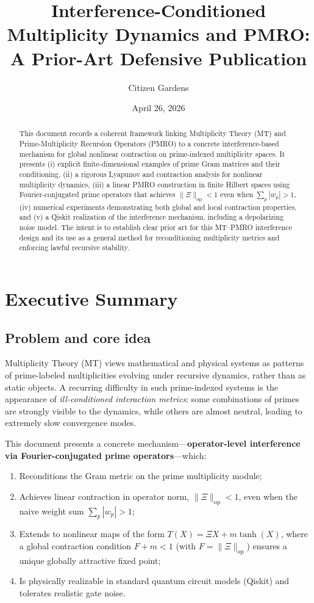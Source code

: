 \documentclass[11pt]{article}
\title{Interference-Conditioned Multiplicity Dynamics and PMRO:\\
A Prior-Art Defensive Publication}
\author{Citizen Gardens}
\affil{The Foundation of Multiplicity}
\date{April 26, 2026}
\begin{document}
\maketitle

\begin{abstract}
This document records a coherent framework linking Multiplicity Theory (MT) and Prime-Multiplicity Recursion Operators (PMRO) to a concrete interference-based mechanism for global nonlinear contraction on prime-indexed multiplicity spaces. It presents (i) explicit finite-dimensional examples of prime Gram matrices and their conditioning, (ii) a rigorous Lyapunov and contraction analysis for nonlinear multiplicity dynamics, (iii) a linear PMRO construction in finite Hilbert spaces using Fourier-conjugated prime operators that achieves $\|\Xi\|_{\mathrm{op}} < 1$ even when $\sum_p |w_p| > 1$, (iv) numerical experiments demonstrating both global and local contraction properties, and (v) a Qiskit realization of the interference mechanism, including a depolarizing noise model. The intent is to establish clear prior art for this MT--PMRO interference design and its use as a general method for reconditioning multiplicity metrics and enforcing lawful recursive stability.
\end{abstract}
\newpage
\tableofcontents
\newpage
\section{Executive Summary}

\subsection{Problem and core idea}

Multiplicity Theory (MT) views mathematical and physical systems as patterns of prime-labeled multiplicities evolving under recursive dynamics, rather than as static objects. A recurring difficulty in such prime-indexed systems is the appearance of \emph{ill-conditioned interaction metrics}: some combinations of primes are strongly visible to the dynamics, while others are almost neutral, leading to extremely slow convergence modes.

This document presents a concrete mechanism---\textbf{operator-level interference via Fourier-conjugated prime operators}---which:
\begin{enumerate}[label=(\alph*)]
  \item Reconditions the Gram metric on the prime multiplicity module;
  \item Achieves linear contraction in operator norm, $\|\Xi\|_{\mathrm{op}} < 1$, even when the naive weight sum $\sum_p |w_p| > 1$;
  \item Extends to nonlinear maps of the form $T(X)=\Xi X + m \tanh(X)$, where a global contraction condition $F + m < 1$ (with $F=\|\Xi\|_{\mathrm{op}}$) ensures a unique globally attractive fixed point;
  \item Is physically realizable in standard quantum circuit models (Qiskit) and tolerates realistic gate noise.
\end{enumerate}
\end{document}
